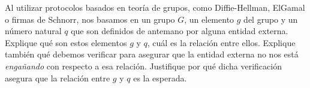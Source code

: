 Al utilizar protocolos basados en teoría de grupos, como Diffie-Hellman, ElGamal o firmas de Schnorr, nos basamos en un grupo $G$, un elemento $g$ del grupo y un número natural $q$ que son definidos de antemano por alguna entidad externa. Explique qué son estos elementos $g$ y $q$, cuál es la relación entre ellos. Explique también qué debemos verificar para asegurar que la entidad externa no nos está \emph{engañando} con respecto a esa relación. Justifique por qué dicha verificación asegura que la relación entre $g$ y $q$ es la esperada.
